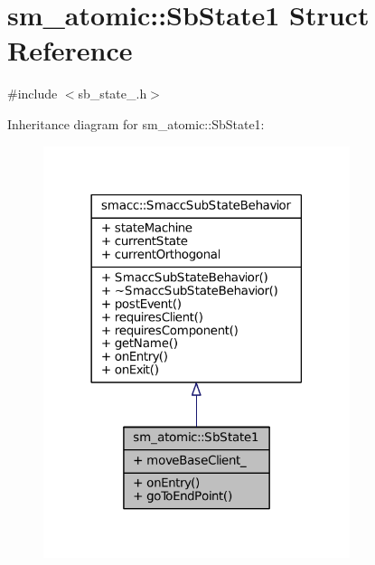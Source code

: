 \hypertarget{structsm__atomic_1_1SbState1}{}\section{sm\+\_\+atomic\+:\+:Sb\+State1 Struct Reference}
\label{structsm__atomic_1_1SbState1}


{\ttfamily \#include $<$sb\+\_\+state\+\_.\+h$>$}



Inheritance diagram for sm\+\_\+atomic\+:\+:Sb\+State1\+:
\nopagebreak
\begin{figure}[H]
\begin{center}
\leavevmode
\includegraphics[width=254pt]{structsm__atomic_1_1SbState1__inherit__graph}
\end{center}
\end{figure}


